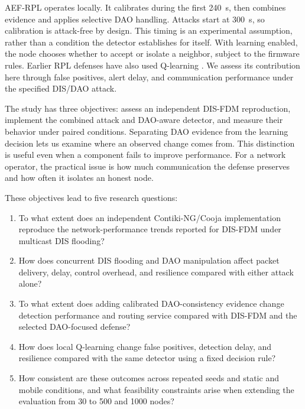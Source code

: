 AEF-RPL operates locally. It calibrates during the first 240~s, then combines evidence and applies selective DAO handling. Attacks start at 300~s, so calibration is attack-free by design. This timing is an experimental assumption, rather than a condition the detector establishes for itself. With learning enabled, the node chooses whether to accept or isolate a neighbor, subject to the firmware rules. Earlier RPL defenses have also used Q-learning \cite{qsecrpl2023,itrpl2024}. We assess its contribution here through false positives, alert delay, and communication performance under the specified DIS/DAO attack.

The study has three objectives: assess an independent DIS-FDM reproduction, implement the combined attack and DAO-aware detector, and measure their behavior under paired conditions. Separating DAO evidence from the learning decision lets us examine where an observed change comes from. This distinction is useful even when a component fails to improve performance. For a network operator, the practical issue is how much communication the defense preserves and how often it isolates an honest node.

These objectives lead to five research questions:
\begin{enumerate}
\item[\emph{RQ1:}] To what extent does an independent Contiki-NG/Cooja implementation reproduce the network-performance trends reported for DIS-FDM under multicast DIS flooding?
\item[\emph{RQ2:}] How does concurrent DIS flooding and DAO manipulation affect packet delivery, delay, control overhead, and resilience compared with either attack alone?
\item[\emph{RQ3:}] To what extent does adding calibrated DAO-consistency evidence change detection performance and routing service compared with DIS-FDM and the selected DAO-focused defense?
\item[\emph{RQ4:}] How does local Q-learning change false positives, detection delay, and resilience compared with the same detector using a fixed decision rule?
\item[\emph{RQ5:}] How consistent are these outcomes across repeated seeds and static and mobile conditions, and what feasibility constraints arise when extending the evaluation from 30 to 500 and 1000 nodes?
\end{enumerate}

